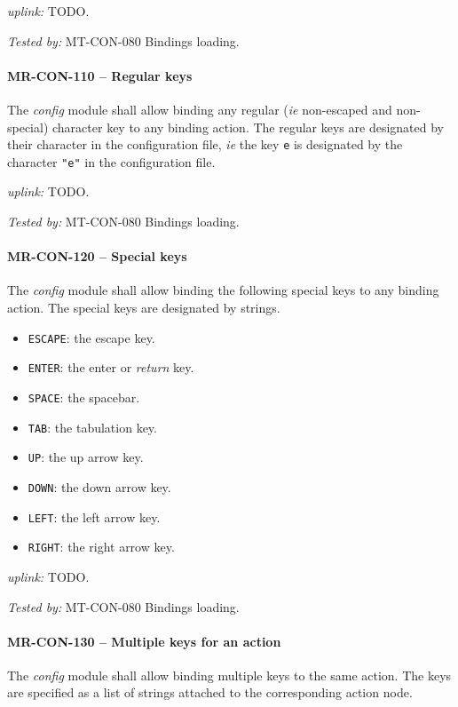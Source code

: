 \textit{uplink: } TODO.

\textit{Tested by: } MT-CON-080 Bindings loading.

\paragraph{MR-CON-110 -- Regular keys}
The \emph{config} module shall allow binding any regular (\textit{ie}
non-escaped and non-special) character key to any binding action.
The regular keys are designated by their character in the configuration
file, \textit{ie} the key \lstinline{e} is designated by the character
\lstinline{"e"} in the configuration file.

\textit{uplink: } TODO.

\textit{Tested by: } MT-CON-080 Bindings loading.

\paragraph{MR-CON-120 -- Special keys}
The \emph{config} module shall allow binding the following special
keys to any binding action. The special keys are designated by strings.
\begin{itemize}
\item \lstinline{ESCAPE}: the escape key.
\item \lstinline{ENTER}: the enter or \emph{return} key.
\item \lstinline{SPACE}: the spacebar.
\item \lstinline{TAB}: the tabulation key.
\item \lstinline{UP}: the up arrow key.
\item \lstinline{DOWN}: the down arrow key.
\item \lstinline{LEFT}: the left arrow key.
\item \lstinline{RIGHT}: the right arrow key.
\end{itemize}

\textit{uplink: } TODO.

\textit{Tested by: } MT-CON-080 Bindings loading.

\paragraph{MR-CON-130 -- Multiple keys for an action}
The \emph{config} module shall allow binding multiple keys to the
same action. The keys are specified as a list of strings attached
to the corresponding action node.

